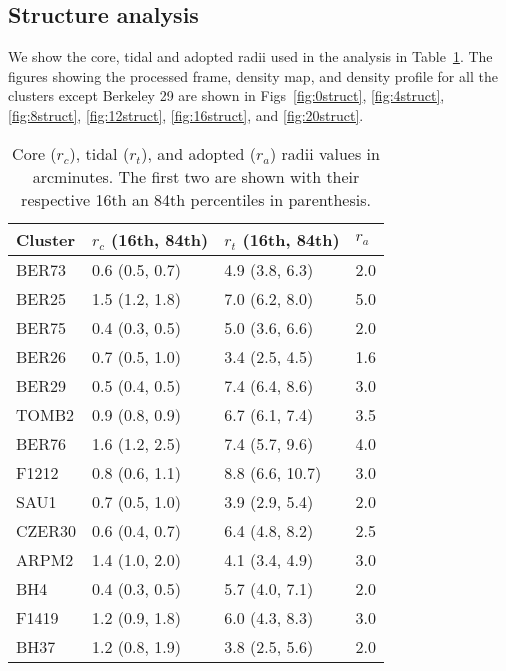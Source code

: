 \documentclass{aa}
\begin{document}
\begin{appendix}

\FloatBarrier
\section{Structure analysis}
 \label{app:struct_analysis}

 We show the core, tidal and adopted radii used in the analysis in
 Table~\ref{tab:radii}. The figures showing the processed frame, density map,
 and density profile for all the clusters except Berkeley 29 are shown in
 Figs~\ref{fig:0struct}, \ref{fig:4struct}, \ref{fig:8struct}, 
 \ref{fig:12struct}, \ref{fig:16struct}, and \ref{fig:20struct}.

 \begin{table}[h!]
 \caption{Core ($r_{c}$), tidal ($r_{t}$), and adopted ($r_{a}$) radii values
 in arcminutes. The first two are shown with their respective 16th an 84th
 percentiles in parenthesis.}
 \label{tab:radii}
 \centering
 \begin{tabular}{llll}
 \hline\hline
 Cluster & $r_{c}$ (16th, 84th) &  $r_{t}$ (16th, 84th) & $r_{a}$\\
 \hline
  BER73         & 0.6 (0.5, 0.7) &  4.9 (3.8, 6.3) &  2.0\\
  BER25         & 1.5 (1.2, 1.8) &  7.0 (6.2, 8.0) &  5.0\\
  BER75         & 0.4 (0.3, 0.5) &  5.0 (3.6, 6.6) &  2.0\\
  BER26         & 0.7 (0.5, 1.0) &  3.4 (2.5, 4.5) &  1.6\\
  BER29         & 0.5 (0.4, 0.5) &  7.4 (6.4, 8.6) &  3.0\\
  TOMB2         & 0.9 (0.8, 0.9) &  6.7 (6.1, 7.4) &  3.5\\
  BER76         & 1.6 (1.2, 2.5) &  7.4 (5.7, 9.6) &  4.0\\
  F1212         & 0.8 (0.6, 1.1) &  8.8 (6.6, 10.7) & 3.0\\
  SAU1          & 0.7 (0.5, 1.0) &  3.9 (2.9, 5.4) &  2.0\\
  CZER30        & 0.6 (0.4, 0.7) &  6.4 (4.8, 8.2) &  2.5\\
  ARPM2         & 1.4 (1.0, 2.0) &  4.1 (3.4, 4.9) &  3.0\\
  BH4           & 0.4 (0.3, 0.5) &  5.7 (4.0, 7.1) &  2.0\\
  F1419         & 1.2 (0.9, 1.8) &  6.0 (4.3, 8.3) &  3.0\\
  BH37          & 1.2 (0.8, 1.9) &  3.8 (2.5, 5.6) &  2.0\\

\end{tabular}
\end{table}
\end{appendix}
\end{document}
